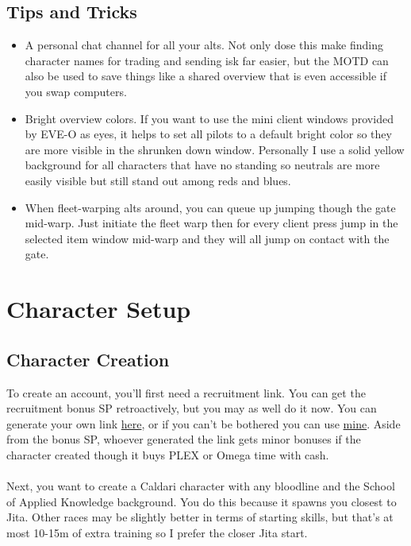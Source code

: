 \documentclass{article}
\begin{document}
\subsection{Tips and Tricks}
\begin{itemize}
  \item A personal chat channel for all your alts. Not only dose this make finding character names for trading and sending isk far easier,
        but the MOTD can also be used to save things like a shared overview that is even accessible if you swap computers.
  \item Bright overview colors. If you want to use the mini client windows provided by EVE-O as eyes, it helps to set all pilots to a default
        bright color so they are more visible in the shrunken down window. Personally I use a solid yellow background for all characters that
        have no standing so neutrals are more easily visible but still stand out among reds and blues.
  \item When fleet-warping alts around, you can queue up jumping though the gate mid-warp. Just initiate the fleet warp then for every client
        press jump in the selected item window mid-warp and they will all jump on contact with the gate.
\end{itemize}



\clearpage
\section{Character Setup}
\subsection{Character Creation}
To create an account, you'll first need a recruitment link. You can get the recruitment bonus SP retroactively, but you may as well do it now. 
You can generate your own link \href{https://www.eveonline.com/recruit}{here}, or if you can't be bothered you can use \href{https://www.eveonline.com/signup?invc=79ffb3de-ef43-400b-a568-e45ac72c6715}{mine}.
Aside from the bonus SP, whoever generated the link gets minor bonuses if the character created though it buys PLEX or Omega time with cash.
\\
\\
Next, you want to create a Caldari character with any bloodline and the School of Applied Knowledge background. You do this because it spawns
you closest to Jita. Other races may be slightly better in terms of starting skills, but that's at most 10-15m of extra training so I prefer the
closer Jita start.
\end{document}
